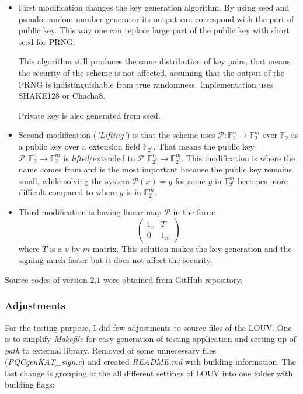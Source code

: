 \documentclass[thesis=M,english]{FITthesis}[2019/12/23]
\begin{document}
\begin{itemize}
\item	First modification changes the key generation algorithm. By using seed and pseudo-random number generator its output can correspond with the part of public key. This way one can replace large part of the public key with short seed for PRNG.

This algorithm still produces the same distribution of key pairs, that means the security of the scheme is not affected, assuming that the output of the PRNG is indistinguishable from true randomness. Implementation uses SHAKE128 or Chacha8.

Private key is also generated from seed.

\item	Second modification (\textit{"Lifting"}) is that the scheme uses $\mathcal{P}:\mathbb{F}_2^n \rightarrow \mathbb{F}_2^m$ over $\mathbb{F}_2$ as a public key over a extension field $\mathbb{F}_{2^r}$. That means the public key $\mathcal{P}:\mathbb{F}_2^n \rightarrow \mathbb{F}_2^m$ is \textit{lifted}/extended to $\mathcal{P}:\mathbb{F}_{2^r}^n \rightarrow \mathbb{F}_{2^r}^m$. This modification is where the name comes from and is the most important because the public key remains small, while solving the system $\mathcal{P}(x) = y$ for some $y$ in $\mathbb{F}_{2^r}^m$ becomes more difficult compared to where $y$ is in $\mathbb{F}_{2}^m$.\cite{L-LIFTING}

\item	Third modification is having linear map $\mathcal{P}$ in the form:
\begin{equation*}
\begin{pmatrix}
1_v & T\\
0 & 1_m
\end{pmatrix}
\end{equation*}
where $T$ is a $v$-by-$m$ matrix. This solution makes the key generation and the signing much faster\cite{L-CZYP} but it does not affect the security.\cite{L-EQ-KEYS}
\end{itemize}

Source codes of version $2.1$ were obtained from GitHub repository.

\subsubsection{Adjustments}
For the testing purpose, I did few adjustments to source files of the LOUV. One is to simplify \textit{Makefile} for easy generation of testing application and setting up of \textit{path} to external library. Removed of some unnecessary files (\textit{PQCgenKAT\_sign.c}) and created \textit{README.md} with building information. The last change is grouping of the all different settings of LOUV into one folder with building flags:
\end{document}

